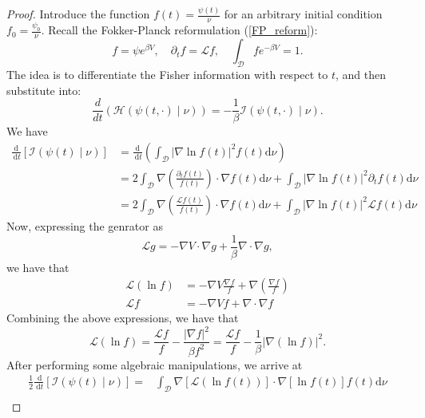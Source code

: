 \documentclass[11pt, twoside]{report}
\begin{document}
\begin{proof}
    Introduce the function $ f(t) = \frac{\psi(t)}{\nu} $ for an arbitrary initial condition $ f_0 = \frac{\psi_0}{\nu} $. Recall the Fokker-Planck reformulation (\ref{FP_reform}):
    \[
    f = \psi e^{\beta V}, \quad \partial_t f = \mathcal{L}f, \quad \int_\mathcal{D} f e^{-\beta V} = 1.
    \]
    The idea is to differentiate the Fisher information with respect to $t$, and then substitute into:
    \[
    \frac{d}{dt} \left( \mathcal{H}(\psi(t,\cdot) \mid \nu) \right) = -\frac{1}{\beta} \mathcal{I}(\psi(t,\cdot) \mid \nu).
    \]
We have
\begin{equation}
\begin{aligned}
\frac{\mathrm{d}}{\mathrm{~d} t}[\mathcal{I}(\psi(t) \mid \nu)] & =\frac{\mathrm{d}}{\mathrm{~d} t}\left(\int_{\mathcal{D}}|\nabla \ln f(t)|^2 f(t) \mathrm{d} \nu\right) \\
& =2 \int_{\mathcal{D}} \nabla\left(\frac{\partial_t f(t)}{f(t)}\right) \cdot \nabla f(t) \mathrm{d} \nu+\int_{\mathcal{D}}|\nabla \ln f(t)|^2 \partial_t f(t) \mathrm{d} \nu \\
& =2 \int_{\mathcal{D}} \nabla\left(\frac{\mathcal{L} f(t)}{f(t)}\right) \cdot \nabla f(t) \mathrm{d} \nu+\int_{\mathcal{D}}|\nabla \ln f(t)|^2 \mathcal{L} f(t) \mathrm{d} \nu
\end{aligned}
\end{equation}
Now, expressing the genrator as 
\[\mathcal{L} g = -\nabla V \cdot \nabla g + \frac{1}{\beta}\nabla \cdot \nabla g,\]
we have that
\begin{align}
    \mathcal{L} (\ln f) &= -\nabla V \frac{\nabla f}{f} + \nabla \left(\frac{\nabla f}{f} \right) \\
    \mathcal{L} f &= -\nabla V f + \nabla \cdot \nabla f
\end{align}
Combining the above expressions, we have that
\begin{equation}
\mathcal{L}(\ln f)=\frac{\mathcal{L} f}{f}-\frac{|\nabla f|^2}{\beta f^2}=\frac{\mathcal{L} f}{f}-\frac{1}{\beta}|\nabla(\ln f)|^2.
\end{equation}
After performing some algebraic manipulations, we arrive at
\begin{equation}
\begin{aligned}
\frac{1}{2} \frac{\mathrm{~d}}{\mathrm{~d} t}[\mathcal{I}(\psi(t) \mid \nu)]= & \int_{\mathcal{D}} \nabla[\mathcal{L}(\ln f(t))] \cdot \nabla[\ln f(t)] f(t) \mathrm{d} \nu \\

\end{aligned}
\end{equation}
\end{proof}
\end{document}
